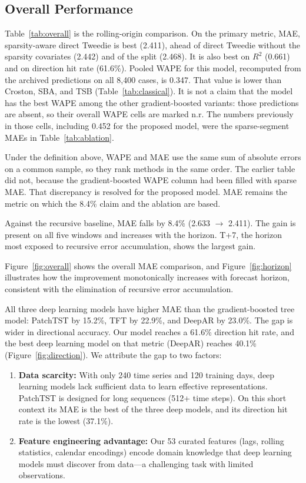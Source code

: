 \documentclass[review,authoryear]{elsarticle}
\begin{document}
\subsection{Overall Performance}

\label{sec:results}
Table~\ref{tab:overall} is the rolling-origin comparison. On the primary metric, MAE, sparsity-aware direct Tweedie is best (2.411), ahead of direct Tweedie without the sparsity covariates (2.442) and of the split (2.468). It is also best on $R^{2}$ (0.661) and on direction hit rate (61.6\%). Pooled WAPE for this model, recomputed from the archived predictions on all 8{,}400 cases, is 0.347. That value is lower than Croston, SBA, and TSB (Table~\ref{tab:classical}). It is not a claim that the model has the best WAPE among the other gradient-boosted variants: those predictions are absent, so their overall WAPE cells are marked n.r. The numbers previously in those cells, including 0.452 for the proposed model, were the sparse-segment MAEs in Table~\ref{tab:ablation}.

Under the definition above, WAPE and MAE use the same sum of absolute errors on a common sample, so they rank methods in the same order. The earlier table did not, because the gradient-boosted WAPE column had been filled with sparse MAE. That discrepancy is resolved for the proposed model. MAE remains the metric on which the 8.4\% claim and the ablation are based.

Against the recursive baseline, MAE falls by 8.4\% (2.633 $\rightarrow$ 2.411). The gain is present on all five windows and increases with the horizon. T+7, the horizon most exposed to recursive error accumulation, shows the largest gain.

Figure~\ref{fig:overall} shows the overall MAE comparison, and Figure~\ref{fig:horizon} illustrates how the improvement monotonically increases with forecast horizon, consistent with the elimination of recursive error accumulation.

All three deep learning models have higher MAE than the gradient-boosted tree model: PatchTST by 15.2\%, TFT by 22.9\%, and DeepAR by 23.0\%. The gap is wider in directional accuracy. Our model reaches a 61.6\% direction hit rate, and the best deep learning model on that metric (DeepAR) reaches 40.1\% (Figure~\ref{fig:direction}). We attribute the gap to two factors:

\begin{enumerate}
    \item \textbf{Data scarcity:} With only 240 time series and 120 training days, deep learning models lack sufficient data to learn effective representations. PatchTST is designed for long sequences (512+ time steps). On this short context its MAE is the best of the three deep models, and its direction hit rate is the lowest (37.1\%).
    \item \textbf{Feature engineering advantage:} Our 53 curated features (lags, rolling statistics, calendar encodings) encode domain knowledge that deep learning models must discover from data---a challenging task with limited observations.
\end{enumerate}
\end{document}
